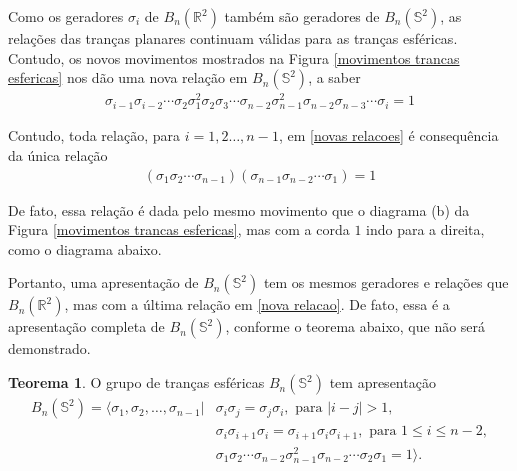 \documentclass[a4paper,portuguese,11pt,twoside, leqno]{book}
\makeatletter
\newcounter{braid}
\newcounter{strands}
\def\cross{%
	\@ifnextchar^{\message{Got sup}\cross@sup}{\cross@sub}}
\def\cross@sup^#1_#2{\render@cross{#2}{#1}}
\def\cross@sub_#1{\@ifnextchar^{\cross@@sub{#1}}{\render@cross{#1}{1}}}
\def\cross@@sub#1^#2{\render@cross{#1}{#2}}
\def\render@cross#1#2{
	\def\strand{#1}
	\def\crossing{#2}
	\pgfmathsetmacro{\cross@y}{-\value{braid}*\braid@h}
	\pgfmathtruncatemacro{\nextstrand}{#1+1}
	\foreach \thread in {1,...,\value{strands}}
	{
		\pgfmathsetmacro{\strand@x}{\thread * \braid@w}
		\ifnum\thread=\strand
		\pgfmathsetmacro{\over@x}{\strand * \braid@w + .5*(1 - \crossing) * \braid@w}
		\pgfmathsetmacro{\under@x}{\strand * \braid@w + .5*(1 + \crossing) * \braid@w}
		\draw[braid] \pgfkeysvalueof{/tikz/braid start} +(\under@x pt,\cross@y pt) to[out=-90,in=90] +(\over@x pt,\cross@y pt -\braid@h);
		\draw[braid] \pgfkeysvalueof{/tikz/braid start} +(\over@x pt,\cross@y pt) to[out=-90,in=90] +(\under@x pt,\cross@y pt -\braid@h);
		\else
		\ifnum\thread=\nextstrand
		\else
		\draw[braid] \pgfkeysvalueof{/tikz/braid start} ++(\strand@x pt,\cross@y pt) -- ++(0,-\braid@h);
		\fi
		\fi
	}
	\stepcounter{braid}
}
\newcommand{\braid}[2][]{%
	\begingroup
	\pgfkeys{/tikz/strands=2}
	\tikzset{#1}
	\pgfkeysgetvalue{/tikz/braid width}{\braid@w}
	\pgfkeysgetvalue{/tikz/braid height}{\braid@h}
	\setcounter{braid}{0}
	\let\sigma=\cross
	#2
	\endgroup
}
\theoremstyle{definition}
\newtheorem{theorem}{Teorema}[section]
\makeatother
\begin{document}
	\par\vspace{0.3cm} Como os geradores $\sigma_i$ de $B_n(\mathbb{R}^2)$ também são geradores de $B_n(\mathbb{S}^2)$, as relações das tranças planares continuam válidas para as tranças esféricas. Contudo, os novos movimentos mostrados na Figura \eqref{movimentos trancas esfericas} nos dão uma nova relação em $B_n(\mathbb{S}^2)$, a saber
	\begin{align}
	\sigma_{i-1}\sigma_{i-2}\cdots\sigma_2\sigma_1^2\sigma_2\sigma_3\cdots\sigma_{n-2}\sigma_{n-1}^2\sigma_{n-2}\sigma_{n-3}\cdots\sigma_i = 1
	\label{novas relacoes}
	\end{align}
	\par\vspace{0.3cm} Contudo, toda relação, para $i=1,2\dots,n-1$, em \eqref{novas relacoes} é consequência da única relação
	\begin{align}
	(\sigma_1\sigma_2\cdots\sigma_{n-1})(\sigma_{n-1}\sigma_{n-2}\cdots\sigma_1) = 1
	\label{nova relacao}
	\end{align}
	\par\vspace{0.3cm} De fato, essa relação é dada pelo mesmo movimento que o diagrama (b) da Figura \eqref{movimentos trancas esfericas}, mas com a corda $1$ indo para a direita, como o diagrama abaixo.
	\begin{center}
	\end{center}
	\par\vspace{0.3cm} Portanto, uma apresentação de $B_n(\mathbb{S}^2)$ tem os mesmos geradores e relações que $B_n(\mathbb{R}^2)$, mas com a última relação em \eqref{nova relacao}. De fato, essa é a apresentação completa de $B_n(\mathbb{S}^2)$, conforme o teorema abaixo, que não será demonstrado.
	
	\begin{theorem}
		\label{apresentacao de B_n(S^2)}
		O grupo de tranças esféricas $B_n(\mathbb{S}^2)$ tem apresentação	
		\begin{align*}
		B_n(\mathbb{S}^2) = \langle \sigma_1, \sigma_2, \dots, \sigma_{n-1}|&\sigma_i\sigma_j = \sigma_j\sigma_i, \text{ para } |i - j|>1, \\ 
		&\sigma_i\sigma_{i+1}\sigma_i = \sigma_{i+1}\sigma_i\sigma_{i+1}, \text{ para } 1\leq i\leq n-2 , \\
		&\sigma_1\sigma_2\cdots\sigma_{n-2}\sigma_{n-1}^2\sigma_{n-2}\cdots\sigma_2\sigma_1 = 1  \rangle.
		\end{align*} 
	\end{theorem}  
	
\end{document}
